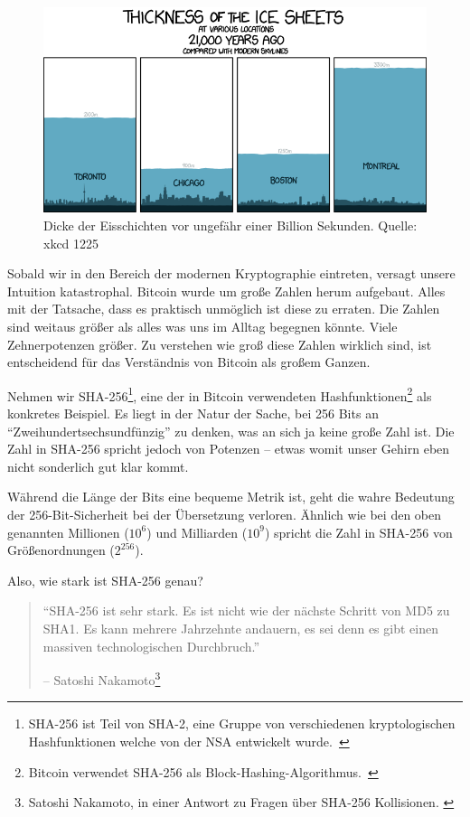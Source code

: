 \begin{figure}
  \includegraphics{assets/images/xkcd-1225.png}
  \caption{Dicke der Eisschichten vor ungefähr einer Billion Sekunden. Quelle: xkcd 1225}
  \label{fig:xkcd-1225}
\end{figure}

Sobald wir in den Bereich der modernen Kryptographie eintreten, versagt unsere
Intuition katastrophal. Bitcoin wurde um große Zahlen herum aufgebaut. Alles mit
der Tatsache, dass es praktisch unmöglich ist diese zu erraten. Die Zahlen sind
weitaus größer als alles was uns im Alltag begegnen könnte. Viele Zehnerpotenzen
größer. Zu verstehen wie groß diese Zahlen wirklich sind, ist entscheidend für
das Verständnis von Bitcoin als großem Ganzen.

Nehmen wir SHA-256\footnote{SHA-256 ist Teil von SHA-2, eine Gruppe von
verschiedenen kryptologischen Hashfunktionen welche von der NSA entwickelt
wurde.~\cite{wiki:sha2}}, eine der in Bitcoin verwendeten
Hashfunktionen\footnote{Bitcoin verwendet SHA-256 als
Block-Hashing-Algorithmus.~\cite{btcwiki:block-hashing}} als konkretes Beispiel.
Es liegt in der Natur der Sache, bei 256 Bits an
\enquote{Zweihundertsechsundfünzig} zu denken, was an sich ja keine große Zahl
ist. Die Zahl in SHA-256 spricht jedoch von Potenzen -- etwas womit unser Gehirn
eben nicht sonderlich gut klar kommt.

Während die Länge der Bits eine bequeme Metrik ist, geht die wahre Bedeutung der
256-Bit-Sicherheit bei der Übersetzung verloren. Ähnlich wie bei den oben
genannten Millionen ($10^6$) und Milliarden ($10^9$) spricht die Zahl in SHA-256
von Größenordnungen ($2^{256}$).

Also, wie stark ist SHA-256 genau?

\begin{quotation}\begin{samepage}
\enquote{SHA-256 ist sehr stark. Es ist nicht wie der nächste Schritt von MD5 zu
SHA1. Es kann mehrere Jahrzehnte andauern, es sei denn es gibt einen massiven
technologischen Durchbruch.}
\begin{flushright} -- Satoshi Nakamoto\footnote{Satoshi Nakamoto, in einer
Antwort zu Fragen über SHA-256 Kollisionen. \cite{satoshi-sha256}}
\end{flushright}\end{samepage}\end{quotation}

